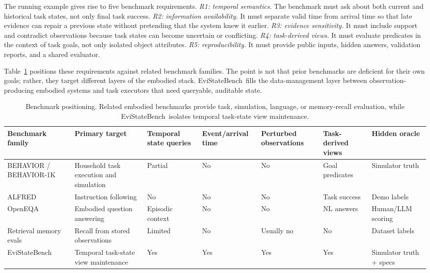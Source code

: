 \documentclass[conference]{IEEEtran}
\newcommand{\bench}{EviStateBench}
\begin{document}
The running example gives rise to five benchmark requirements. \emph{R1: temporal semantics.} The benchmark must ask about both current and historical task states, not only final task success. \emph{R2: information availability.} It must separate valid time from arrival time so that late evidence can repair a previous state without pretending that the system knew it earlier. \emph{R3: evidence sensitivity.} It must include support and contradict observations because task states can become uncertain or conflicting. \emph{R4: task-derived views.} It must evaluate predicates in the context of task goals, not only isolated object attributes. \emph{R5: reproducibility.} It must provide public inputs, hidden answers, validation reports, and a shared evaluator.

Table~\ref{tab:related-benchmarks} positions these requirements against related benchmark families. The point is not that prior benchmarks are deficient for their own goals; rather, they target different layers of the embodied stack. \bench\ fills the data-management layer between observation-producing embodied systems and task executors that need queryable, auditable state.

\begin{table}[!t]
\caption{Benchmark positioning. Related embodied benchmarks provide task, simulation, language, or memory-recall evaluation, while \bench\ isolates temporal task-state view maintenance.}
\label{tab:related-benchmarks}
\centering
\scriptsize
{\setlength{\tabcolsep}{2pt}
\begin{tabular}{@{}p{}p{}p{}p{}p{}p{}p{}@{}}
\toprule
Benchmark family & Primary target & Temporal state queries & Event/arrival time & Perturbed observations & Task-derived views & Hidden oracle \\
\midrule
BEHAVIOR / BEHAVIOR-1K & Household task execution and simulation & Partial & No & No & Goal predicates & Simulator truth \\
ALFRED & Instruction following & No & No & No & Task success & Demo labels \\
OpenEQA & Embodied question answering & Episodic context & No & No & NL answers & Human/LLM scoring \\
Retrieval memory evals & Recall from stored observations & Limited & No & Usually no & No & Dataset labels \\
\bench & Temporal task-state view maintenance & Yes & Yes & Yes & Yes & Simulator truth + specs \\
\bottomrule
\end{tabular}
}
\end{table}
\end{document}
